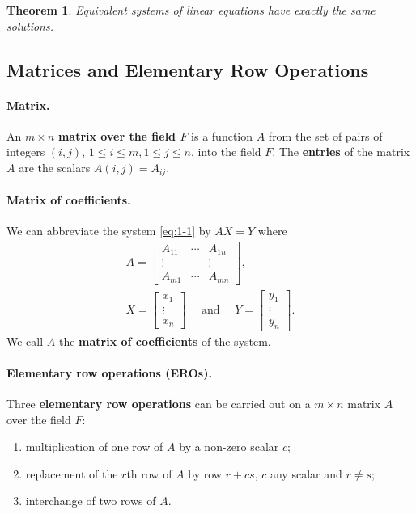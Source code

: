 \documentclass{article}
\newtheorem{theorem}{Theorem}
\begin{document}
\begin{theorem}
  Equivalent systems of linear equations have exactly the same solutions.
\end{theorem}

\subsection{Matrices and Elementary Row Operations}

\paragraph{Matrix.} An $m \times n$ \textbf{matrix over the field $F$} is a
function $A$ from the set of pairs of integers $(i, j)$, $1 \leq i \leq m, 1
\leq j \leq n$, into the field $F$. The \textbf{entries} of the matrix $A$ are
the scalars $A(i, j) = A_{ij}$.

\paragraph{Matrix of coefficients.} We can abbreviate the system \eqref{eq:1-1}
by $AX = Y$ where
\begin{gather*}
  A = \begin{bmatrix}
    A_{11} & \cdots & A_{1n} \\
    \vdots & & \vdots \\
    A_{m1} & \cdots & A_{mn}
  \end{bmatrix}, \\
  X = \begin{bmatrix}
    x_1 \\
    \vdots \\
    x_n
  \end{bmatrix}
  \quad\text{ and }\quad
  Y = \begin{bmatrix}
    y_1 \\
    \vdots \\
    y_n
  \end{bmatrix}.
\end{gather*}
We call $A$ the \textbf{matrix of coefficients} of the system.

\paragraph{Elementary row operations (EROs).} Three \textbf{elementary row
operations} can be carried out on a $m \times n$ matrix $A$ over the field $F$:
\begin{enumerate}
  \item multiplication of one row of $A$ by a non-zero scalar $c$;
  \item replacement of the $r$th row of $A$ by row $r + cs$, $c$ any scalar and
    $r \neq s$;
  \item interchange of two rows of $A$.
\end{enumerate}
\end{document}
